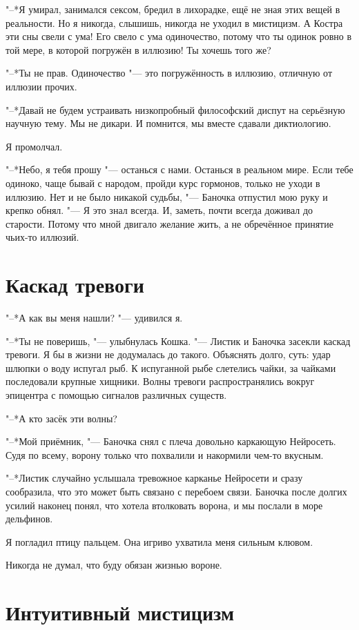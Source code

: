 "--*Я умирал, занимался сексом, бредил в лихорадке, ещё не зная этих вещей в реальности.
Но я никогда, слышишь, никогда не уходил в мистицизм.
А Костра эти сны свели с ума!
Его свело с ума одиночество, потому что ты одинок ровно в той мере, в которой погружён в иллюзию!
Ты хочешь того же?

"--*Ты не прав.
Одиночество "--- это погружённость в иллюзию, отличную от иллюзии прочих.

"--*Давай не будем устраивать низкопробный философский диспут на серьёзную научную тему.
Мы не дикари.
И помнится, мы вместе сдавали диктиологию.

Я промолчал.

"--*Небо, я тебя прошу "--- останься с нами.
Останься в реальном мире.
Если тебе одиноко, чаще бывай с народом, пройди курс гормонов, только не уходи в иллюзию.
Нет и не было никакой судьбы, "--- Баночка отпустил мою руку и крепко обнял.
"--- Я это знал всегда.
И, заметь, почти всегда доживал до старости.
Потому что мной двигало желание жить, а не обречённое принятие чьих-то иллюзий.

\section{Каскад тревоги}

"--*А как вы меня нашли? "--- удивился я.

"--*Ты не поверишь, "--- улыбнулась Кошка.
"--- Листик и Баночка засекли каскад тревоги.
Я бы в жизни не додумалась до такого.
Объяснять долго, суть: удар шлюпки о воду испугал рыб.
К испуганной рыбе слетелись чайки, за чайками последовали крупные хищники.
Волны тревоги распространялись вокруг эпицентра с помощью сигналов различных существ.

"--*А кто засёк эти волны?

"--*Мой приёмник, "--- Баночка снял с плеча довольно каркающую Нейросеть.
Судя по всему, ворону только что похвалили и накормили чем-то вкусным.

"--*Листик случайно услышала тревожное карканье Нейросети и сразу сообразила, что это может быть связано с перебоем связи.
Баночка после долгих усилий наконец понял, что хотела втолковать ворона, и мы послали в море дельфинов.

Я погладил птицу пальцем.
Она игриво ухватила меня сильным клювом.

Никогда не думал, что буду обязан жизнью вороне.

\section{Интуитивный мистицизм}

